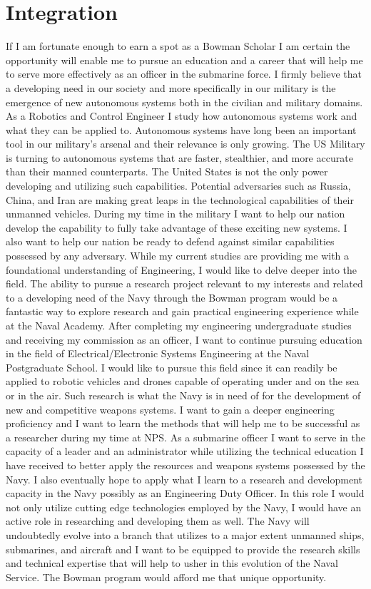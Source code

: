 \documentclass[10pt]{article}
\begin{document}
\section{Integration}
	If I am fortunate enough to earn a spot as a Bowman Scholar I am certain the opportunity will enable me to pursue an education and a career that will help me to serve more effectively as an officer in the submarine force. I firmly believe that a developing need in our society and more specifically in our military is the emergence of new autonomous systems both in the civilian and military domains. As a Robotics and Control Engineer I study how autonomous systems work and what they can be applied to. Autonomous systems have long been an important tool in our military’s arsenal and their relevance is only growing. The US Military is turning to autonomous systems that are faster, stealthier, and more accurate than their manned counterparts. The United States is not the only power developing and utilizing such capabilities. Potential adversaries such as Russia, China, and Iran are making great leaps in the technological capabilities of their unmanned vehicles. During my time in the military I want to help our nation develop the capability to fully take advantage of these exciting new systems. I also want to help our nation be ready to defend against similar capabilities possessed by any adversary. While my current studies are providing me with a foundational understanding of Engineering, I would like to delve deeper into the field. The ability to pursue a research project relevant to my interests and related to a developing need of the Navy through the Bowman program would be a fantastic way to explore research and gain practical engineering experience while at the Naval Academy. After completing my engineering undergraduate studies and receiving my commission as an officer, I want to continue pursuing education in the field of Electrical/Electronic Systems Engineering at the Naval Postgraduate School. I would like to pursue this field since it can readily be applied to robotic vehicles and drones capable of operating under and on the sea or in the air. Such research is what the Navy is in need of for the development of new and competitive weapons systems. I want to gain a deeper engineering proficiency and I want to learn the methods that will help me to be successful as a researcher during my time at NPS. As a submarine officer I want to serve in the capacity of a leader and an administrator while utilizing the technical education I have received to better apply the resources and weapons systems possessed by the Navy. I also eventually hope to apply what I learn to a research and development capacity in the Navy possibly as an Engineering Duty Officer. In this role I would not only utilize cutting edge technologies employed by the Navy, I would have an active role in researching and developing them as well. The Navy will undoubtedly evolve into a branch that utilizes to a major extent unmanned ships, submarines, and aircraft and I want to be equipped to provide the research skills and technical expertise that will help to usher in this evolution of the Naval Service. The Bowman program would afford me that unique opportunity. 
	

\end{document}
